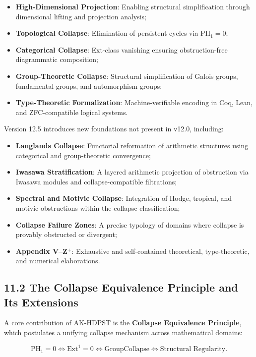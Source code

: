 \documentclass[11pt]{article}
\begin{document}
\begin{itemize}
    \item \textbf{High-Dimensional Projection}: Enabling structural simplification through dimensional lifting and projection analysis;
    \item \textbf{Topological Collapse}: Elimination of persistent cycles via \( \mathrm{PH}_1 = 0 \);
    \item \textbf{Categorical Collapse}: Ext-class vanishing ensuring obstruction-free diagrammatic composition;
    \item \textbf{Group-Theoretic Collapse}: Structural simplification of Galois groups, fundamental groups, and automorphism groups;
    \item \textbf{Type-Theoretic Formalization}: Machine-verifiable encoding in Coq, Lean, and ZFC-compatible logical systems.
\end{itemize}

Version 12.5 introduces new foundations not present in v12.0, including:

\begin{itemize}
    \item \textbf{Langlands Collapse}: Functorial reformation of arithmetic structures using categorical and group-theoretic convergence;
    \item \textbf{Iwasawa Stratification}: A layered arithmetic projection of obstruction via Iwasawa modules and collapse-compatible filtrations;
    \item \textbf{Spectral and Motivic Collapse}: Integration of Hodge, tropical, and motivic obstructions within the collapse classification;
    \item \textbf{Collapse Failure Zones}: A precise typology of domains where collapse is provably obstructed or divergent;
    \item \textbf{Appendix V--Z$^+$}: Exhaustive and self-contained theoretical, type-theoretic, and numerical elaborations.
\end{itemize}

\subsection*{11.2 The Collapse Equivalence Principle and Its Extensions}

A core contribution of AK-HDPST is the \textbf{Collapse Equivalence Principle}, which postulates a unifying collapse mechanism across mathematical domains:

\[
\mathrm{PH}_1 = 0 \iff \mathrm{Ext}^1 = 0 \iff \mathrm{GroupCollapse} \iff \text{Structural Regularity}.
\]
\end{document}
